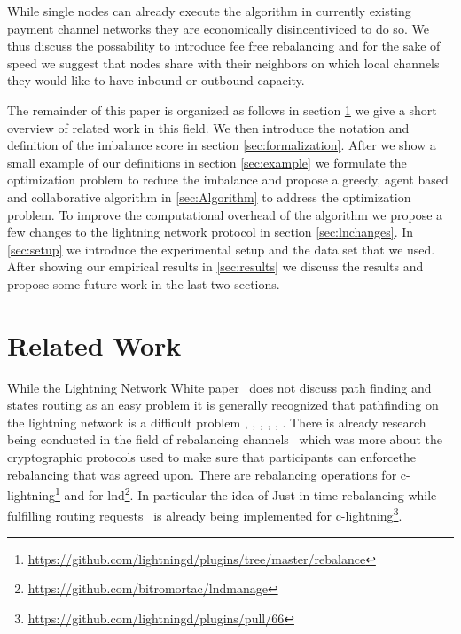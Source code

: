 \documentclass[a4paper]{paper}
\begin{document}
While single nodes can already execute the algorithm in currently existing payment channel networks they are economically disincentiviced to do so.
We thus discuss the possability to introduce fee free rebalancing and for the sake of speed we suggest that nodes share with their neighbors on which local channels they would like to have inbound or outbound capacity. 

The remainder of this paper is organized as follows in section \cref{sec:relatedWork} we give a short overview of related work in this field.
We then introduce the notation and definition of the imbalance score in section \cref{sec:formalization}.
After we show a small example of our definitions in section \cref{sec:example} we formulate the optimization problem to reduce the imbalance and propose a greedy, agent based and collaborative algorithm in \ref{sec:Algorithm} to address the optimization problem.
To improve the computational overhead of the algorithm we propose a few changes to the lightning network protocol in section \ref{sec:lnchanges}.
In \cref{sec:setup} we introduce the experimental setup and the data set that we used.
After showing our empirical results in \cref{sec:results} we discuss the results and propose some future work in the last two sections.



\section{Related Work}
\label{sec:relatedWork}

While the Lightning Network White paper~\cite{poon2016bitcoin} does not discuss path finding and states routing as an easy problem it is generally recognized that pathfinding on the lightning network is a difficult problem \cite{piatkivskyi2018split}, \cite{prihodko2016flare}, \cite{bagaria2019boomerang}, \cite{pickhardt2019pathfinding}, \cite{grunspan2018ant}, \cite{sivaraman2018routing}.
There is already research being conducted in the field of rebalancing channels~\cite{khalil2017revive} which was more about the cryptographic protocols used to make sure that participants can enforcethe rebalancing that was agreed upon.
There are rebalancing operations for c-lightning\footnote{\url{https://github.com/lightningd/plugins/tree/master/rebalance}} and for lnd\footnote{\url{https://github.com/bitromortac/lndmanage}}.
In particular the idea of Just in time rebalancing while fulfilling routing requests~\cite{pickhardt2019jit} is already being implemented for c-lightning\footnote{\url{https://github.com/lightningd/plugins/pull/66}}. 
\end{document}
